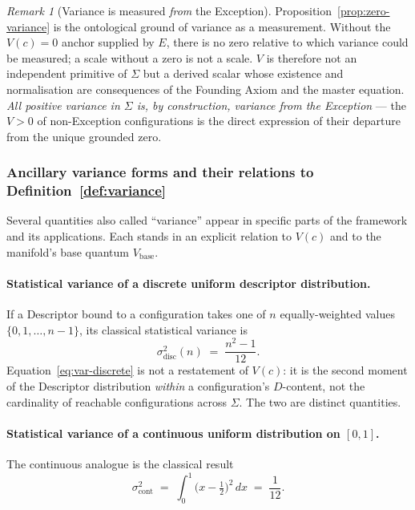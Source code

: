 \documentclass[11pt,a4paper]{article}
\theoremstyle{definition}
\theoremstyle{remark}
\newtheorem{remark}[theorem]{Remark}
\begin{document}
\begin{remark}[Variance is measured \emph{from} the Exception]\label{rem:variance-from-E}
Proposition~\ref{prop:zero-variance} is the ontological ground of variance as a measurement. Without the $V(c) = 0$ anchor supplied by $E$, there is no zero relative to which variance could be measured; a scale without a zero is not a scale. $V$ is therefore not an independent primitive of $\Sigma$ but a derived scalar whose existence and normalisation are consequences of the Founding Axiom and the master equation. \emph{All positive variance in $\Sigma$ is, by construction, variance from the Exception} --- the $V>0$ of non-Exception configurations is the direct expression of their departure from the unique grounded zero.
\end{remark}

\subsubsection*{Ancillary variance forms and their relations to Definition~\ref{def:variance}}

Several quantities also called ``variance'' appear in specific parts of the framework and its applications. Each stands in an explicit relation to $V(c)$ and to the manifold's base quantum $V_{\text{base}}$.

\paragraph{Statistical variance of a discrete uniform descriptor distribution.}
If a Descriptor bound to a configuration takes one of $n$ equally-weighted values $\{0,1,\ldots,n-1\}$, its classical statistical variance is
\begin{equation}\label{eq:var-discrete}
\sigma^{2}_{\text{disc}}(n) \;=\; \frac{n^{2}-1}{12}.
\end{equation}
Equation~\eqref{eq:var-discrete} is not a restatement of $V(c)$: it is the second moment of the Descriptor distribution \emph{within} a configuration's $D$-content, not the cardinality of reachable configurations across $\Sigma$. The two are distinct quantities.

\paragraph{Statistical variance of a continuous uniform distribution on $[0,1]$.}
The continuous analogue is the classical result
\begin{equation}\label{eq:var-continuous}
\sigma^{2}_{\text{cont}} \;=\; \int_{0}^{1}\!\bigl(x-\tfrac{1}{2}\bigr)^{2}\,dx \;=\; \frac{1}{12}.
\end{equation}
\end{document}
